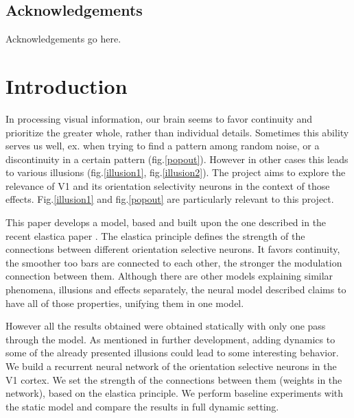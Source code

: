 \maketitle

\section*{Acknowledgements}
Acknowledgements go here. 

\tableofcontents
\listoffigures



\chapter{Introduction}

In processing visual information, our brain seems to favor continuity and prioritize the greater whole, rather than individual details. Sometimes this ability serves us well, ex. when trying to find a pattern among random noise, or a discontinuity in a certain pattern (fig.\ref{popout}). However in other cases this leads to various illusions (fig.\ref{illusion1}, fig.\ref{illusion2}). The project aims to explore the relevance of V1 and its orientation selectivity neurons in the context of those effects. Fig.\ref{illusion1} and fig.\ref{popout} are particularly relevant to this project.

This paper develops a model, based and built upon the one described in the recent elastica paper \cite{keemink2015unified}. The elastica principle defines the strength of the connections between different orientation selective neurons. It favors continuity, the smoother too bars are connected to each other, the stronger the modulation connection between them. Although there are other models explaining similar phenomena, illusions and effects separately, the neural model described claims to have all of those properties, unifying them in one model. 

However all the results obtained were obtained statically with only one pass through the model. As mentioned in further development, adding dynamics to some of the already presented illusions could lead to some interesting behavior. We build a recurrent neural network of the orientation selective neurons in the V1 cortex. We set the strength of the connections between them (weights in the network), based on the elastica principle. We perform baseline experiments with the static model and compare the results in full dynamic setting.

